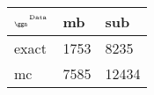 \begin{tabular}{lll}
    \toprule
    $_{\text{\tiny{\ggn}}}$$^{\text{\tiny{Data}}}$ & mb & sub \\
    \midrule
    exact & 1753
              & 8235 \\
    mc   & 7585
              & 12434 \\
    \bottomrule
\end{tabular}